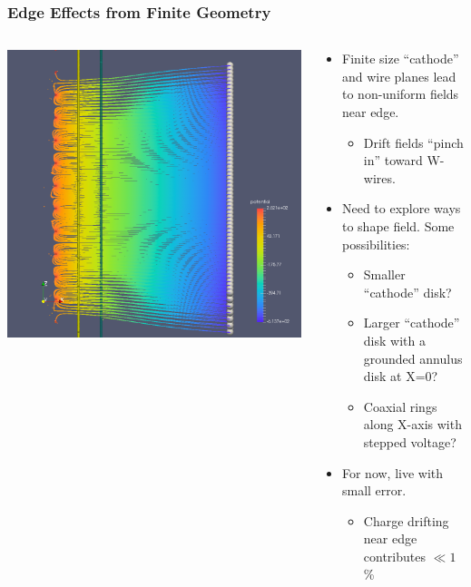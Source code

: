 \documentclass[xcolor=dvipsnames]{beamer}
\begin{document}
\begin{frame}
  \frametitle{Edge Effects from Finite Geometry}
  \begin{columns}
    \begin{column}{0.4\textwidth}
      \begin{center}
        \includegraphics[width=\textwidth,clip,trim=4cm 0cm 10cm 0cm]{steps/upaths2.png}    
      \end{center}
    \end{column}
    \begin{column}{0.6\textwidth}
      \begin{itemize}
      \item Finite size ``cathode'' and wire planes lead to
        non-uniform fields near edge.
        \begin{itemize}\footnotesize
        \item Drift fields ``pinch in'' toward W-wires.
        \end{itemize}
      \item Need to explore ways to shape field.  Some possibilities:
        \begin{itemize}\footnotesize
        \item Smaller ``cathode'' disk?
        \item Larger ``cathode'' disk with a grounded annulus disk at X=0?
        \item Coaxial rings along X-axis with stepped voltage?
        \end{itemize}
      \item For now, live with small error.  
        \begin{itemize}\footnotesize
        \item Charge drifting near edge contributes $\ll 1$\%
        \end{itemize}
      \end{itemize}
    \end{column}
  \end{columns}
  
\end{frame}
\end{document}
